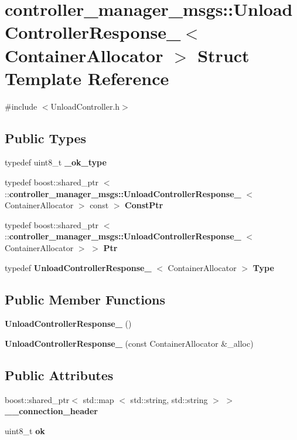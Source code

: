 \section{controller\-\_\-manager\-\_\-msgs\-:\-:\-Unload\-Controller\-Response\-\_\-$<$ \-Container\-Allocator $>$ \-Struct \-Template \-Reference}
\label{structcontroller__manager__msgs_1_1UnloadControllerResponse__}


{\ttfamily \#include $<$\-Unload\-Controller.\-h$>$}

\subsection*{\-Public \-Types}
\begin{DoxyCompactItemize}
\item 
typedef uint8\-\_\-t {\bf \-\_\-ok\-\_\-type}
\item 
typedef boost\-::shared\-\_\-ptr\*
$<$ \-::{\bf controller\-\_\-manager\-\_\-msgs\-::\-Unload\-Controller\-Response\-\_\-}\*
$<$ \-Container\-Allocator $>$ const  $>$ {\bf \-Const\-Ptr}
\item 
typedef boost\-::shared\-\_\-ptr\*
$<$ \-::{\bf controller\-\_\-manager\-\_\-msgs\-::\-Unload\-Controller\-Response\-\_\-}\*
$<$ \-Container\-Allocator $>$ $>$ {\bf \-Ptr}
\item 
typedef \*
{\bf \-Unload\-Controller\-Response\-\_\-}\*
$<$ \-Container\-Allocator $>$ {\bf \-Type}
\end{DoxyCompactItemize}
\subsection*{\-Public \-Member \-Functions}
\begin{DoxyCompactItemize}
\item 
{\bf \-Unload\-Controller\-Response\-\_\-} ()
\item 
{\bf \-Unload\-Controller\-Response\-\_\-} (const \-Container\-Allocator \&\-\_\-alloc)
\end{DoxyCompactItemize}
\subsection*{\-Public \-Attributes}
\begin{DoxyCompactItemize}
\item 
boost\-::shared\-\_\-ptr$<$ std\-::map\*
$<$ std\-::string, std\-::string $>$ $>$ {\bf \-\_\-\-\_\-connection\-\_\-header}
\item 
uint8\-\_\-t {\bf ok}
\end{DoxyCompactItemize}


